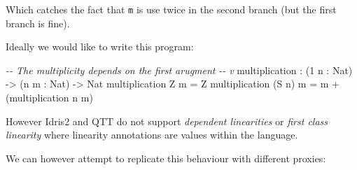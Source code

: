 \documentclass[
]{article}
\newenvironment{Shaded}{}{}
\newcommand{\CommentTok}[1]{\textcolor[rgb]{0.38,0.63,0.69}{\textit{#1}}}
\newcommand{\DataTypeTok}[1]{\textcolor[rgb]{0.56,0.13,0.00}{#1}}
\newcommand{\DecValTok}[1]{\textcolor[rgb]{0.25,0.63,0.44}{#1}}
\newcommand{\NormalTok}[1]{#1}
\newcommand{\OperatorTok}[1]{\textcolor[rgb]{0.40,0.40,0.40}{#1}}
\newcommand{\OtherTok}[1]{\textcolor[rgb]{0.00,0.44,0.13}{#1}}
\begin{document}
Which catches the fact that \texttt{m} is use twice in the second branch
(but the first branch is fine).

Ideally we would like to write this program:

\begin{Shaded}
\begin{Highlighting}[]
\CommentTok{{-}{-}        The multiplicity depends on the first arugment}
\CommentTok{{-}{-}                               v}
\NormalTok{multiplication }\OperatorTok{:}\NormalTok{ (}\DecValTok{1}\NormalTok{ n }\OperatorTok{:} \DataTypeTok{Nat}\NormalTok{) }\OtherTok{{-}\textgreater{}}\NormalTok{ (n m }\OperatorTok{:} \DataTypeTok{Nat}\NormalTok{) }\OtherTok{{-}\textgreater{}} \DataTypeTok{Nat}
\NormalTok{multiplication }\DataTypeTok{Z}\NormalTok{ m }\OtherTok{=} \DataTypeTok{Z}
\NormalTok{multiplication (}\DataTypeTok{S}\NormalTok{ n) m }\OtherTok{=}\NormalTok{ m }\OperatorTok{+}\NormalTok{ (multiplication n m)}
\end{Highlighting}
\end{Shaded}

However Idris2 and QTT do not support \emph{dependent linearities} or
\emph{first class linearity} where linearity annotations are values
within the language.

We can however attempt to replicate this behaviour with different
proxies:
\end{document}
